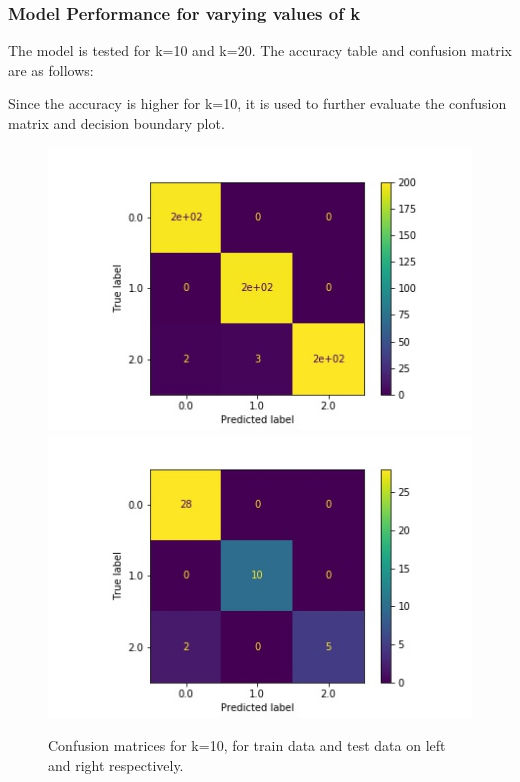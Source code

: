 \documentclass[11pt,a4paper]{article}
\begin{document}
\subsubsection{Model Performance for varying values of k}

The model is tested for k=10 and k=20. The accuracy table and confusion matrix are as follows:


Since the accuracy is higher for k=10, it is used to further evaluate the confusion matrix and decision boundary plot. 

\begin{figure}[H]
    \centering
    \includegraphics[scale=0.5]{images/1b_cm_nb_train.jpg}
    \includegraphics[scale=0.5]{images/1b_cm_nb_test.jpg}
    \caption{Confusion matrices for k=10, for train data and test data on left and right respectively.}
    \label{fig:1b_cm_nb}
\end{figure}
\end{document}
